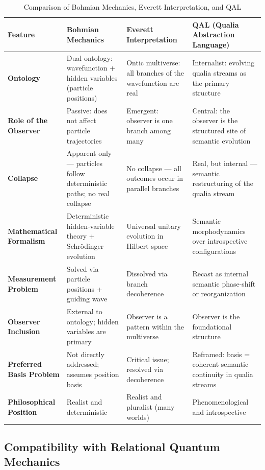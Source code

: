 \documentclass[11pt]{article}
\numberwithin{equation}{section} %
\begin{document}
\begin{table}[H]
\centering
\renewcommand{\arraystretch}{1.4}
\begin{tabular}{|p{}|p{}|p{}|p{}|}
\hline
\textbf{Feature} & \textbf{Bohmian Mechanics} & \textbf{Everett Interpretation} & \textbf{QAL (Qualia Abstraction Language)} \\
\hline
\textbf{Ontology} & Dual ontology: wavefunction + hidden variables (particle positions) & Ontic multiverse: all branches of the wavefunction are real & Internalist: evolving qualia streams as the primary structure \\
\hline
\textbf{Role of the Observer} & Passive: does not affect particle trajectories & Emergent: observer is one branch among many & Central: the observer is the structured site of semantic evolution \\
\hline
\textbf{Collapse} & Apparent only — particles follow deterministic paths; no real collapse & No collapse — all outcomes occur in parallel branches & Real, but internal — semantic restructuring of the qualia stream \\
\hline
\textbf{Mathematical Formalism} & Deterministic hidden-variable theory + Schrödinger evolution & Universal unitary evolution in Hilbert space & Semantic morphodynamics over introspective configurations \\
\hline
\textbf{Measurement Problem} & Solved via particle positions + guiding wave & Dissolved via branch decoherence & Recast as internal semantic phase-shift or reorganization \\
\hline
\textbf{Observer Inclusion} & External to ontology; hidden variables are primary & Observer is a pattern within the multiverse & Observer is the foundational structure \\
\hline
\textbf{Preferred Basis Problem} & Not directly addressed; assumes position basis & Critical issue; resolved via decoherence & Reframed: basis = coherent semantic continuity in qualia streams \\
\hline
\textbf{Philosophical Position} & Realist and deterministic & Realist and pluralist (many worlds) & Phenomenological and introspective \\
\hline
\end{tabular}
\caption{Comparison of Bohmian Mechanics, Everett Interpretation, and QAL}
\label{tab:bohm-everett-qal-comparison}
\end{table}

\subsection{Compatibility with Relational Quantum Mechanics}
\end{document}
